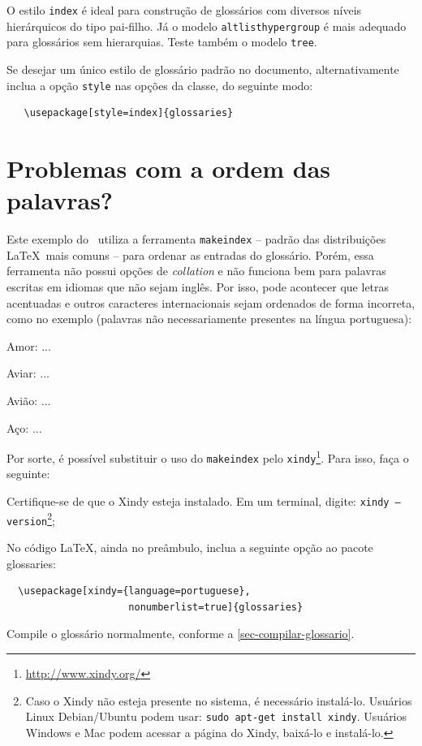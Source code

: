 O estilo \texttt{index} é ideal para construção de glossários com diversos
níveis hierárquicos do tipo pai-filho. Já o modelo \texttt{altlisthypergroup} é
mais adequado para glossários sem hierarquias. Teste também o modelo
\texttt{tree}.

Se desejar um único estilo de glossário padrão no documento, alternativamente
inclua a opção \texttt{style} nas opções da classe, do
seguinte modo:

\begin{verbatim}
   \usepackage[style=index]{glossaries}
\end{verbatim}

\section{Problemas com a ordem das palavras?}

Este exemplo do \abnTeX\ utiliza a ferramenta \texttt{makeindex} -- padrão das
distribuições \LaTeX\ mais comuns -- para ordenar as entradas do glossário.
Porém, essa ferramenta não possui opções de \textit{collation} e não funciona
bem para palavras escritas em idiomas que não sejam inglês.
Por isso, pode acontecer que letras acentuadas e outros caracteres
internacionais sejam ordenados de forma incorreta, como no exemplo (palavras não
necessariamente presentes na língua portuguesa):

\begin{alineas}
 \item Amor: ...
 \item Aviar: ...
 \item Avião: ...
 \item Aço: ...
\end{alineas}

Por sorte, é possível substituir o uso do \texttt{makeindex}
pelo \texttt{xindy}\footnote{\url{http://www.xindy.org/}}. Para isso, faça o
seguinte:

\begin{alineas}
  \item Certifique-se de que o Xindy esteja instalado. Em um terminal, digite:
  \texttt{xindy --version}\footnote{Caso o Xindy não esteja presente no sistema,
    é necessário instalá-lo. Usuários Linux Debian/Ubuntu podem usar: 
    \texttt{sudo apt-get install xindy}. Usuários Windows e Mac podem acessar
    a página do Xindy, baixá-lo e instalá-lo.};
  \item No código LaTeX, ainda no preâmbulo, inclua a seguinte opção ao pacote glossaries:
  \indent
  \begin{verbatim}
  \usepackage[xindy={language=portuguese},
                     nonumberlist=true]{glossaries}
  \end{verbatim}
  \item Compile o glossário normalmente, conforme a
  \autoref{sec-compilar-glossario}.
\end{alineas}


